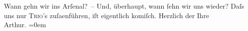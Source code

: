 \begin{ledgroupsized}[t]{13cm}
           \pstart
           Wann gehn wir ins Arſenal? –\pend
           \pstart
           Und, überhaupt, wann ſehn wir uns wieder? Daſs uns nur \textsc{Trio}’s zuſa{\geminationm}enführen, iſt eigentlich komiſch.\pend
           \pstart
           Herzlich der Ihre{\\[\baselineskip]}\spacefill\mbox{Arthur.}\pend
           \leftskip=0em{}\endnumbering{}\end{ledgroupsized}  \newcommand{\dateiname}{L00305}\newcommand{\titel}{Arthur Schnitzler an Hugo von Hofmannsthal, [9. 3. 1894]}\newcommand{\editorInnen}{Martin Anton Müller und Gerd-Hermann Susen}
      